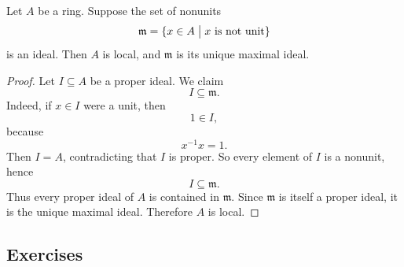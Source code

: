\documentclass[11pt]{article}
\begin{document}
\begin{prop}
    Let $A$ be a ring. Suppose the set of nonunits 
    \[
        \mathfrak m = \{x \in A \bigm| x \ \text{is not 
        unit}\}
    \]
    is an ideal. 
    Then $A$ is local, and $\mathfrak m$ is its unique 
    maximal ideal. 
\end{prop}
\begin{proof}
    Let $I \subseteq A$ be a proper ideal. 
    We claim 
    \[
        I \subseteq \mathfrak m. 
    \]
    Indeed, if $x \in I$ were a unit, then 
    \[
        1 \in I,
    \]
    because 
    \[
        x^{-1}x = 1. 
    \]
    Then $I = A$, contradicting that $I$ is proper. 
    So every element of $I$ is a nonunit, hence 
    \[
        I \subseteq \mathfrak m. 
    \]
    Thus every proper ideal of $A$ is contained in 
    $\mathfrak m$. 
    Since $\mathfrak m$ is itself a proper ideal, 
    it is the unique maximal ideal. Therefore $A$ is local. 
\end{proof}

\subsection*{Exercises}
\end{document}
